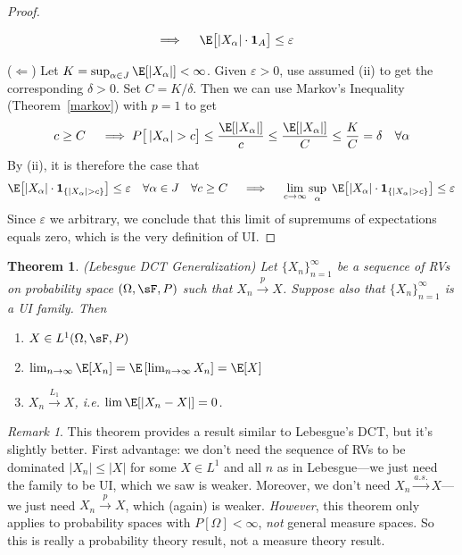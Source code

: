 \documentclass[12pt]{article}
\theoremstyle{plain}
\newtheorem{thm}{Theorem}[section]
\theoremstyle{definition}
\theoremstyle{remark}
\newtheorem*{rmk}{Remark}
\newcommand{\ra}{\rightarrow}
\newcommand{\one}[1]{\mathbf{1}_{#1}}
\newcommand{\asto}{\xrightarrow{a.s.}}
\newcommand{\pto}{\xrightarrow{p}}
\newcommand{\Lqto}[1]{\xrightarrow{L_{#1}}}
\newcommand{\ninf}{_{n=1}^\infty}
\newcommand{\limn}{\lim_{n\rightarrow\infty}}
\begin{document}
\begin{proof}
\begin{enumerate}[label=(\roman*)]
\begin{align*}
      \implies\quad
      \E\big[
        |X_\alpha|\cdot \one{A}
      \big]
      &\leq \varepsilon
    \end{align*}
\end{enumerate}
($\Leftarrow$)
Let $K=\sup_{\alpha \in J}\E[ |X_\alpha|]<\infty$.
Given $\varepsilon>0$, use assumed (ii) to get the corresponding
$\delta>0$.
Set $C = K/\delta$.
Then we can use Markov's Inequality
(Theorem~\ref{markov}) with $p=1$ to get
\begin{align*}
  c\geq C\quad\implies
    P\big[ \left\lvert X_\alpha\right\rvert > c\big]
    \leq \frac{\E[|X_\alpha|]}{c}
    \leq \frac{\E[|X_\alpha|]}{C}
    \leq \frac{K}{C} = \delta
    \quad\forall \alpha
\end{align*}
By (ii), it is therefore the case that
\begin{align*}
  \E\big[
    |X_\alpha|\cdot \one{\{\left\lvert X_\alpha\right\rvert > c\}}
  \big]
  \leq \varepsilon
  \quad \forall \alpha\in J\quad\forall c\geq C
  \quad\implies\quad
  \lim_{c\ra\infty}\sup_\alpha\;
  \E\big[
    |X_\alpha|\cdot \one{\{\left\lvert X_\alpha\right\rvert > c\}}
  \big]
  \leq \varepsilon
\end{align*}
Since $\varepsilon$ we arbitrary, we conclude that this limit of
supremums of expectations equals zero, which is the very definition of
UI.
\end{proof}

\begin{thm}\emph{(Lebesgue DCT Generalization)}
Let $\{X_n\}\ninf$ be a sequence of RVs on probability space
$(\Omega,\sF,P)$ such that $X_n\pto X$. Suppose also that $\{X_n\}\ninf$
is a UI family. Then
\begin{enumerate}[label=\emph{(\roman*)}]
  \item $X\in L^1(\Omega,\sF,P)$
  \item $\limn \E[X_n] = \E\left[\limn X_n\right] = \E[X]$
  \item $X_n \Lqto{1} X$, i.e. $\lim \E[|X_n-X|] = 0$.
\end{enumerate}
\end{thm}
\begin{rmk}
This theorem provides a result similar to Lebesgue's DCT, but it's
slightly better.
First advantage: we don't need the sequence of RVs to be dominated
$|X_n|\leq |X|$ for some $X\in L^1$ and all $n$ as in Lebesgue---we just
need the family to be UI, which we saw is weaker.  Moreover, we don't
need $X_n\asto X$---we just need $X_n\pto X$, which (again) is weaker.
\emph{However}, this theorem only applies to probability spaces with
$P[\Omega]<\infty$, \emph{not} general measure spaces.
So this is really a probability theory result, not a measure theory
result.
\end{rmk}
\end{document}
